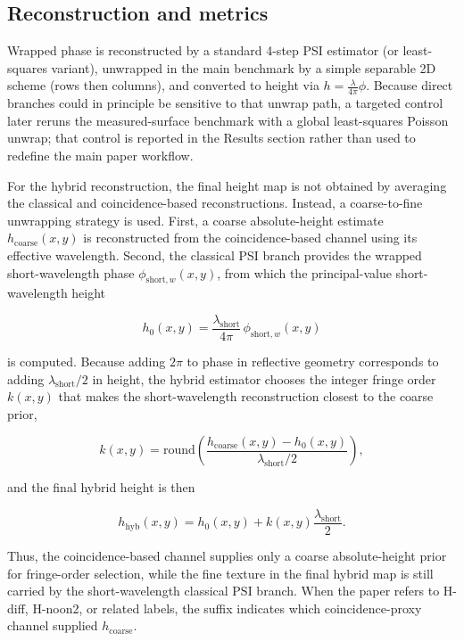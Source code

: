 \documentclass[photonics,article,submit,pdftex,moreauthors]{Definitions/mdpi}
\begin{document}
\subsection{Reconstruction and metrics}
Wrapped phase is reconstructed by a standard 4-step PSI estimator (or least-squares variant), unwrapped in the main benchmark by a simple separable 2D scheme (rows then columns), and converted to height via $h=\tfrac{\lambda}{4\pi}\phi$. Because direct branches could in principle be sensitive to that unwrap path, a targeted control later reruns the measured-surface benchmark with a global least-squares Poisson unwrap; that control is reported in the Results section rather than used to redefine the main paper workflow.

For the hybrid reconstruction, the final height map is not obtained by averaging the classical and coincidence-based reconstructions. Instead, a coarse-to-fine unwrapping strategy is used. First, a coarse absolute-height estimate $h_\mathrm{coarse}(x,y)$ is reconstructed from the coincidence-based channel using its effective wavelength. Second, the classical PSI branch provides the wrapped short-wavelength phase $\phi_{\mathrm{short},w}(x,y)$, from which the principal-value short-wavelength height
\begin{linenomath}
\begin{equation}
h_0(x,y)=\frac{\lambda_\mathrm{short}}{4\pi}\,\phi_{\mathrm{short},w}(x,y)
\end{equation}
\end{linenomath}
is computed. Because adding $2\pi$ to phase in reflective geometry corresponds to adding $\lambda_\mathrm{short}/2$ in height, the hybrid estimator chooses the integer fringe order $k(x,y)$ that makes the short-wavelength reconstruction closest to the coarse prior,
\begin{linenomath}
\begin{equation}
k(x,y)=\mathrm{round}\!\left(\frac{h_\mathrm{coarse}(x,y)-h_0(x,y)}{\lambda_\mathrm{short}/2}\right),
\end{equation}
\end{linenomath}
and the final hybrid height is then
\begin{linenomath}
\begin{equation}
h_\mathrm{hyb}(x,y)=h_0(x,y)+k(x,y)\frac{\lambda_\mathrm{short}}{2}.
\end{equation}
\end{linenomath}
Thus, the coincidence-based channel supplies only a coarse absolute-height prior for fringe-order selection, while the fine texture in the final hybrid map is still carried by the short-wavelength classical PSI branch. When the paper refers to H-diff, H-noon2, or related labels, the suffix indicates which coincidence-proxy channel supplied $h_\mathrm{coarse}$.
\end{document}
